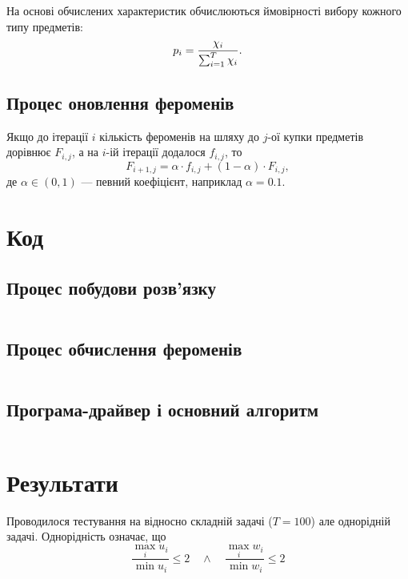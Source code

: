 \documentclass[a4paper, 12pt]{article}
\numberwithin{equation}{section}
\begin{document}
На основі обчислених характеристик обчислюються ймовірності вибору кожного типу предметів:
\begin{equation}
    p_i = \frac{\chi_i}{\operatorname*{\sum}_{i = 1}^T \chi_i}.
\end{equation}

\subsection{Процес оновлення фероменів}

Якщо до ітерації $i$ кількість фероменів на шляху до $j$-ої купки предметів дорівнює $F_{i,j}$, а на $i$-ій ітерації додалося $f_{i,j}$, то
\begin{equation}
    F_{i+1,j} = \alpha \cdot f_{i, j} + (1 - \alpha) \cdot F_{i, j},
\end{equation}
де $\alpha \in (0, 1)$ --- певний коефіцієнт, наприклад $\alpha = 0.1$.

\section{Код}

\subsection{Процес побудови розв'язку}

\inputminted{python}{../../code/knapsack/generate_solution.py}

\subsection{Процес обчислення фероменів}

\inputminted{python}{../../code/knapsack/calculate_feroments.py}

\subsection{Програма-драйвер і основний алгоритм}

\inputminted{python}{../../code/knapsack/main.py}

\section{Результати}

Проводилося тестування на відносно складній задачі ($T = 100$) але однорідній задачі. Однорідність означає, що
\begin{equation}
    \frac{\max_i u_i}{\min u_i} \le 2 \quad \land \quad \frac{\max_i w_i}{\min w_i} \le 2
\end{equation}
\end{document}
